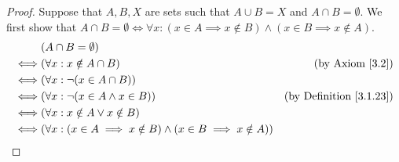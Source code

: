 \begin{proof}
    Suppose that \(A, B, X\) are sets such that \(A \cup B = X\) and \(A \cap B = \emptyset\).
    We first show that \(A \cap B = \emptyset \iff \forall x : (x \in A \implies x \notin B) \land (x \in B \implies x \notin A)\).
    \begin{align*}
             & (A \cap B = \emptyset)                                                                                                \\
        \iff & (\forall x : x \notin A \cap B)                                                 & \text{(by Axiom \ref{3.2})}         \\
        \iff & (\forall x : \lnot (x \in A \cap B))                                                                                  \\
        \iff & (\forall x : \lnot (x \in A \land x \in B))                                     & \text{(by Definition \ref{3.1.23})} \\
        \iff & (\forall x : x \notin A \lor x \notin B)                                                                              \\
        \iff & (\forall x : (x \in A \implies x \notin B) \land (x \in B \implies x \notin A))                                       \\
    \end{align*}


\end{proof}
